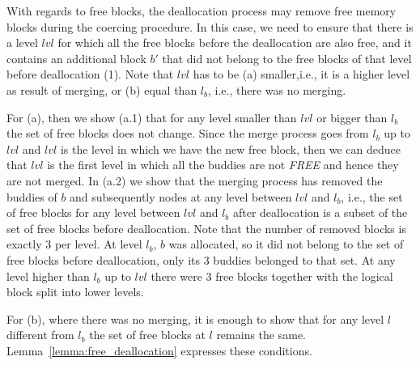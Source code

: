 With regards to free blocks, the deallocation process may remove free memory blocks during the coercing procedure. In this case, we need to ensure that there is a level $lvl$ for which all the free blocks before the deallocation are also free, and it contains an additional block $b'$ that did not belong to the free blocks of that level before deallocation (1). Note that $lvl$ has to be (a) smaller,i.e., it is a higher level as result of merging, or (b) equal than $l_b$, i.e., there was no merging.

For (a), then we show (a.1) that for any level smaller than $lvl$ or bigger than $l_b$ the set of free blocks does not change. Since the merge process goes from $l_b$ up to $lvl$ and  $lvl$ is the level in which we have the new free block, then we can deduce that $lvl$ is the first level in which all the buddies are not \emph{FREE} and hence they are not merged. In (a.2) we show that the merging process has removed the buddies of $b$ and subsequently nodes at any level between $lvl$ and $l_b$, i.e., the set of free blocks for any level between $lvl$ and $l_b$ after deallocation is a subset of the set of free blocks before deallocation. Note that the number of removed blocks is exactly 3 per level. At level $l_b$, $b$ was allocated, so it did not belong to the set of free blocks before deallocation, only its 3 buddies belonged to that set. At any level higher than $l_b$ up to $lvl$ there were 3 free blocks together with the logical block split into lower levels.

For (b), where there was no merging, it is enough to show that for any level $l$ different from $l_b$ the set of free blocks at $l$ remains the same. Lemma~\ref{lemma:free_deallocation} expresses these conditions.

